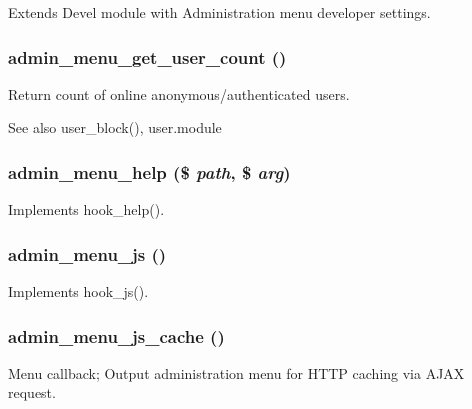 Extends Devel module with Administration menu developer settings. \hypertarget{admin__menu_8module_ad3786315404a78da596963267f80282f}{
\subsubsection[{admin\_\-menu\_\-get\_\-user\_\-count}]{\setlength{\rightskip}{0pt plus 5cm}admin\_\-menu\_\-get\_\-user\_\-count ()}}
\label{admin__menu_8module_ad3786315404a78da596963267f80282f}
Return count of online anonymous/authenticated users.

\begin{DoxySeeAlso}{See also}
user\_\-block(), user.module 
\end{DoxySeeAlso}
\hypertarget{admin__menu_8module_ab8091736c23e24e82ac4954efd6b9a40}{
\subsubsection[{admin\_\-menu\_\-help}]{\setlength{\rightskip}{0pt plus 5cm}admin\_\-menu\_\-help (\$ {\em path}, \/  \$ {\em arg})}}
\label{admin__menu_8module_ab8091736c23e24e82ac4954efd6b9a40}
Implements hook\_\-help(). \hypertarget{admin__menu_8module_ab95b2814fc91e5810e361f155416514f}{
\subsubsection[{admin\_\-menu\_\-js}]{\setlength{\rightskip}{0pt plus 5cm}admin\_\-menu\_\-js ()}}
\label{admin__menu_8module_ab95b2814fc91e5810e361f155416514f}
Implements hook\_\-js(). \hypertarget{admin__menu_8module_a199e7fc41af069dbf54a2e229cfec72b}{
\subsubsection[{admin\_\-menu\_\-js\_\-cache}]{\setlength{\rightskip}{0pt plus 5cm}admin\_\-menu\_\-js\_\-cache ()}}
\label{admin__menu_8module_a199e7fc41af069dbf54a2e229cfec72b}
Menu callback; Output administration menu for HTTP caching via AJAX request.

